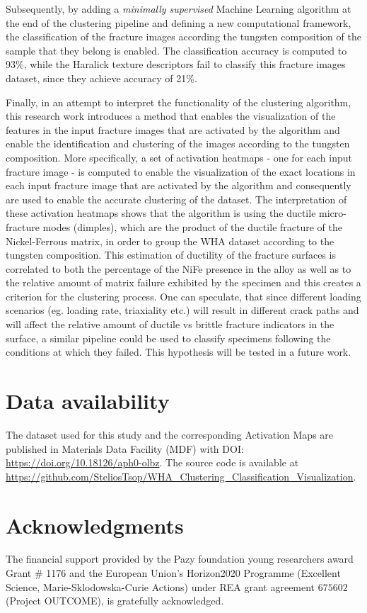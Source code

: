 \documentclass[authoryear,preprint,review,12pt, singleside]{elsarticle}
\begin{document}
Subsequently, by adding a \textit{minimally supervised} Machine Learning algorithm at the end of the clustering pipeline and defining a new computational framework, the classification of the fracture images according the tungsten composition of the sample that they belong is enabled. The classification accuracy is computed to 93\%, while the Haralick texture descriptors fail to classify this fracture images dataset, since they achieve accuracy of 21\%. 

Finally, in an attempt to interpret the functionality of the clustering algorithm, this research work introduces a method that enables the visualization of the features in the input fracture images that are activated by the algorithm and enable the identification and clustering of the images according to the tungsten composition. More specifically, a set of activation heatmaps - one for each input fracture image - is computed to enable the visualization of the exact locations in each input fracture image that are activated by the algorithm and consequently are used to enable the accurate clustering of the dataset. The interpretation of these activation heatmaps shows that the algorithm is using the ductile micro-fracture modes (dimples), which are the product of the ductile fracture of the Nickel-Ferrous matrix, in order to group the WHA dataset according to the tungsten composition. This estimation of ductility of the fracture surfaces is correlated to both the percentage of the NiFe presence in the alloy as well as to the relative amount of matrix failure exhibited by the specimen and this creates a criterion for the clustering process.  One can speculate, that since different loading scenarios (eg. loading rate, triaxiality etc.) will result in different crack paths and will affect the relative amount of ductile vs brittle fracture indicators in the surface, a similar pipeline could be used to classify specimens following the conditions at which they failed. This hypothesis will be tested in a future work.   
 

\section*{Data availability} The  dataset used for this study and the corresponding Activation Maps are published in Materials Data Facility (MDF) with DOI: \url{https://doi.org/10.18126/aph0-olbz}. The source code is available at \url{https://github.com/SteliosTsop/WHA_Clustering_Classification_Visualization}.  

\section*{Acknowledgments}
	The financial support provided by the Pazy foundation young researchers award Grant $\#$ 1176  and the European Union's Horizon2020 Programme (Excellent Science, Marie-Sklodowska-Curie Actions) under REA grant agreement $675602$ (Project OUTCOME), is gratefully acknowledged. 




\clearpage



\end{document}
